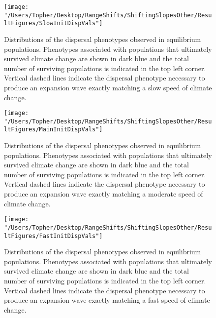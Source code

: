 \documentclass[11pt]{article}
\begin{document}
\clearpage

\begin{figure}[h!]
\texttt{[image: "/Users/Topher/Desktop/RangeShifts/ShiftingSlopesOther/ResultFigures/SlowInitDispVals"]}
\caption{Distributions of the dispersal phenotypes observed in equilibrium populations. Phenotypes associated with populations that ultimately survived climate change are shown in dark blue and the total number of surviving populations is indicated in the top left corner. Vertical dashed lines indicate the dispersal phenotype necessary to produce an expansion wave exactly matching a slow speed of climate change.}
\label{Fig:InitDispSlow}
\end{figure}

\clearpage

\begin{figure}[h!]
\texttt{[image: "/Users/Topher/Desktop/RangeShifts/ShiftingSlopesOther/ResultFigures/MainInitDispVals"]}
\caption{Distributions of the dispersal phenotypes observed in equilibrium populations. Phenotypes associated with populations that ultimately survived climate change are shown in dark blue and the total number of surviving populations is indicated in the top left corner. Vertical dashed lines indicate the dispersal phenotype necessary to produce an expansion wave exactly matching a moderate speed of climate change.}
\label{Fig:InitDispMain}
\end{figure}

\clearpage

\begin{figure}[h!]
\texttt{[image: "/Users/Topher/Desktop/RangeShifts/ShiftingSlopesOther/ResultFigures/FastInitDispVals"]}
\caption{Distributions of the dispersal phenotypes observed in equilibrium populations. Phenotypes associated with populations that ultimately survived climate change are shown in dark blue and the total number of surviving populations is indicated in the top left corner. Vertical dashed lines indicate the dispersal phenotype necessary to produce an expansion wave exactly matching a fast speed of climate change.}
\label{Fig:InitDispFast}
\end{figure}
\end{document}
